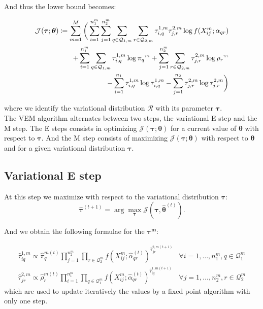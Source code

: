 \documentclass[12pt,a4paper]{report}
\begin{document}
And thus the lower bound becomes:

\begin{align*}
    \mathcal{J}(\bm{\tau};\bm{\theta}) \coloneqq \sum_{m=1}^{M} \bigg(\sum_{i = 1}^{n_1^m}\sum_{j=1}^{n_2^m}\sum_{q \in \mathcal{Q}_{1,m}} \sum_{r \in \mathcal{Q}_{2,m}} \tau^{1,m}_{i,q} \tau^{2,m}_{j,r} \log f(X^{m}_{ij}; \alpha_{qr}) \\
        + \sum_{i=1}^{n_1^m} \sum_{q \in \mathcal{Q}_{1,m}} \tau^{1,m}_{i,q} \log \pi_{\color{black}q}^{\color{gray}m} + \sum_{j=1}^{n_2^m} \sum_{r \in \mathcal{Q}_{2,m}} \tau^{2,m}_{j,r} \log \rho_{\color{black}r}^{\color{gray}m} \\
        - \sum_{i=1}^{n_1} \tau^{1,m}_{i,q} \log \tau^{1,m}_{i,q} - \sum_{j=1}^{n_2} \tau^{2,m}_{j,r} \log \tau^{2,m}_{j,r} \bigg) \color{black}
\end{align*}

where we identify the variational distribution $\mathcal{R}$ with its parameter
$\bm{\tau}$. \\


The VEM algorithm alternates between two steps, the variational E step and the M step.
The E steps consists in optimizing $\mathcal{J}(\bm{\tau};\bm{\theta})$ for a
current value of $\bm{\theta}$ with respect to $\bm{\tau}$. And the M step
consists of maximizing $\mathcal{J}(\bm{\tau};\bm{\theta})$ with respect to
$\bm{\theta}$ and for a given variational distribution $\bm{\tau}$.

\subsection{Variational E step}
\label{ssec:variational-e-step}

At this step we maximize with respect to the variational distribution $\bm{\tau}$:
$$\widehat{\bm{\tau}}^{(t+1)} = \arg \max_{\bm{\tau}} \mathcal{J}(\mathcal{\bm{\tau}},\bm{\widehat{\theta}}^{(t)}).$$

And we obtain the following formulae for the $\bm{\tau^m}$:

\begin{align*}
    \widehat{\tau}_{iq}^{1,m} \propto \widehat{\pi}_{q}^{m(t)} \prod_{j=1}^{n_2^m}\prod_{r\in\mathcal{Q}_2^m} f(X_{ij}^m;\widehat{\alpha}_{qr}^{(t)})^{\widehat{\tau}_{jr}^{2,m(t+1)}}  & \forall i = 1, \dots , n_1^m, q \in \mathcal{Q}_1^m \\
    \widehat{\tau}_{jr}^{2,m} \propto \widehat{\rho}_{r}^{m(t)} \prod_{i=1}^{n_1^m}\prod_{q\in\mathcal{Q}_1^m} f(X_{ij}^m;\widehat{\alpha}_{qr}^{(t)})^{\widehat{\tau}_{iq}^{1,m(t+1)}} & \forall j = 1, \dots , n_2^m, r \in \mathcal{Q}_2^m
\end{align*}
which are used to update iteratively the values by a fixed point algorithm with
only one step.
\end{document}
